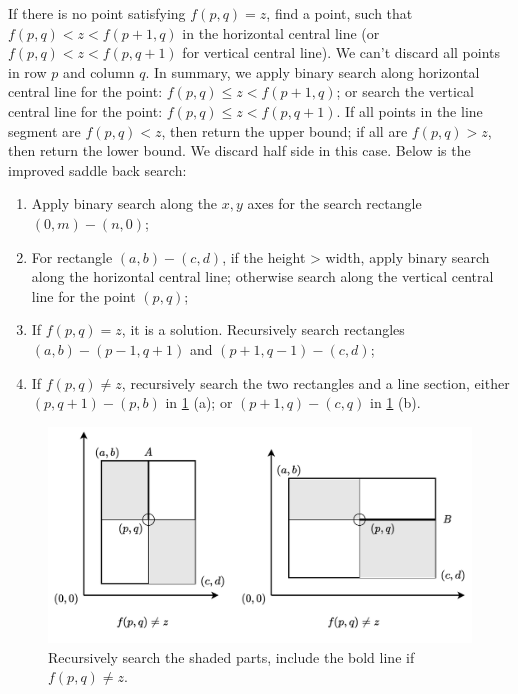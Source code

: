 \documentclass[b5paper]{article}
\begin{document}
If there is no point satisfying $f(p, q) = z$, find a point, such that $f(p, q) < z < f(p + 1, q)$ in the horizontal central line (or $f(p, q) < z < f(p, q + 1)$ for vertical central line). We can't discard all points in row $p$ and column $q$. In summary, we apply binary search along horizontal central line for the point: $f(p, q) \leq z < f(p + 1, q)$; or search the vertical central line for the point: $f(p, q) \leq z < f(p, q + 1)$. If all points in the line segment are $f(p, q) < z$, then return the upper bound; if all are $f(p, q) > z$, then return the lower bound. We discard half side in this case. Below is the improved saddle back search:

\begin{enumerate}
\item Apply binary search along the $x, y$ axes for the search rectangle $(0, m) - (n, 0)$;
\item For rectangle $(a, b) - (c, d)$, if the height > width, apply binary search along the horizontal central line; otherwise search along the vertical central line for the point $(p, q)$;
\item If $f(p, q) = z$, it is a solution. Recursively search rectangles $(a, b) - (p-1, q+1)$ and $(p+1, q-1) - (c, d)$;
\item If $f(p, q) \neq z$, recursively search the two rectangles and  a line section, either $(p, q+1) - (p, b)$ in \cref{fig:include-line} (a); or $(p+1, q) - (c, q)$ in \cref{fig:include-line} (b).
\end{enumerate}

\begin{figure}[htbp]
 \centering
 \includegraphics[scale=0.6]{img/saddleback-mid-line-inc}
 \caption{Recursively search the shaded parts, include the bold line  if $f(p, q) \neq z$.}
 \label{fig:include-line}
\end{figure}
\end{document}
